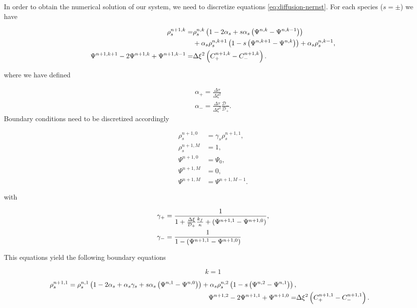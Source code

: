 In order to obtain the numerical solution of our system, we need to discretize equations \ref{eq:diffusion-nernst}. For each species ($s = \pm$) we have

\begin{align}
    \rho_s^{n+1, k} =& \rho_s^{n,k} \left({1 - 2 \alpha_s + s \alpha_s \left({\Psi^{n, k} - \Psi^{n, k-1}}\right)}\right) \\ & + \alpha_s \rho_s^{n, k+1} \left({1 - s \left({\Psi^{n,k+1} - \Psi^{n,k}}\right)}\right) + \alpha_s \rho_s^{n,k-1},\\
    \Psi^{n+1, k+1} - 2\Psi^{n+1,k} + \Psi^{n+1, k-1} =& \Delta \xi^2 \left({C_+^{n+1, k} - C_-^{n+1, k}}\right).
\end{align}

where we have defined 

\begin{eqnarray*}
	\alpha_+ = \frac{\Delta \tau}{\Delta \xi^2}\\
	\alpha_- = \frac{\Delta \tau}{\Delta \xi^2}\frac{\mathcal{D}_-}{\mathcal{D}_+}.
\end{eqnarray*}
Boundary conditions need to be discretized accordingly

\begin{align}
\rho_s^{n+1, 0} &= \gamma_s \rho_s^{n+1, 1},\\
\rho_s^{n+1, M} &= 1,\\
\Psi^{n+1, 0} &= \Psi_0,\\
\Psi^{n+1, M} &= 0,\\
\Psi^{n+1, M} &= \Psi^{n+1, M-1} .
\end{align}


with

\begin{align}
\gamma_+ &= \frac{1}{1 + \frac{\Delta \xi}{\mathcal{D}_+}\frac{k_f}{\kappa} + \left({\Psi^{n+1, 1}-\Psi^{n+1,0}}\right) }, \\
\gamma_- &= \frac{1}{1 - \left({\Psi^{n+1, 1}-\Psi^{n+1,0}}\right) }
\end{align}

This equations yield the following boundary equations

$$ k=1 $$

\begin{align}
    \rho_s^{n+1, 1} = \rho_s^{n,1} \left({1 - 2 \alpha_s + \alpha_s \gamma_s + s \alpha_s \left({\Psi^{n, 1} - \Psi^{n, 0}}\right)}\right) + \alpha_s \rho_s^{n, 2} \left({1 - s \left({\Psi^{n,2} - \Psi^{n,1}}\right)}\right),\\
    \Psi^{n+1, 2} - 2\Psi^{n+1,1} + \Psi^{n+1, 0} =& \Delta \xi^2\left({C_+^{n+1, 1} - C_-^{n+1, 1}}\right).
\end{align}



